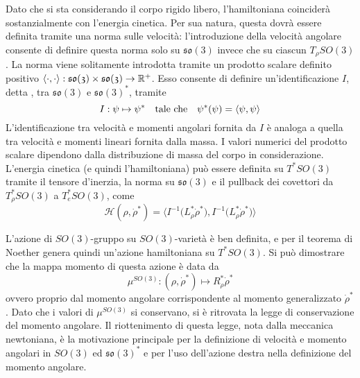 Dato che si sta considerando il corpo rigido libero, l'hamiltoniana coinciderà sostanzialmente con l'energia cinetica. Per sua natura, questa dovrà essere definita tramite una norma sulle velocità: l'introduzione della velocità angolare consente di definire questa norma solo su $\mathfrak{so(3)}$ invece che su ciascun $T_{\rho}SO(3)$. La norma viene solitamente introdotta tramite un prodotto scalare definito positivo $\langle \cdot, \cdot\rangle: \mathfrak{so(3)} \times  \mathfrak{so(3)} \to \mathbb{R}^+$. Esso consente di definire un'identificazione $I$, detta , tra $\mathfrak{so(3)}$ e $\mathfrak{so(3)}^*$, tramite
\begin{equation*}
I: \psi \mapsto \psi^* \qqtext{tale che} \psi^* (\psi) = \langle \psi, \psi \rangle
\end{equation*} 
L'identificazione tra velocità e momenti angolari fornita da $I$ è analoga a quella tra velocità e momenti lineari fornita dalla massa. I valori numerici del prodotto scalare dipendono dalla distribuzione di massa del corpo in considerazione. L'energia cinetica (e quindi l'hamiltoniana) può essere definita su $T^* SO(3)$ tramite il tensore d'inerzia, la norma su $\mathfrak{so(3)}$ e il pullback dei covettori da $T^*_{\rho}SO(3)$ a $T^*_{e}SO(3)$, come
\begin{equation*}
\mathcal{H}(\rho, \dot{\rho}^*) = \Big\langle I^{-1}\big(L^*_\rho \dot{\rho}^*\big), I^{-1}\big(L^*_\rho \dot{\rho}^*\big) \Big\rangle
\end{equation*}

L'azione di $SO(3)$-gruppo su $SO(3)$-varietà è ben definita, e per il teorema di Noether genera quindi un'azione hamiltoniana su $T^*SO(3)$. Si può dimostrare che la mappa momento di questa azione è data da 
\begin{equation*}
\mu^{SO(3)}: (\rho, \dot{\rho}^*) \longmapsto R_{\rho}^* \dot{\rho}^* 
\end{equation*}
ovvero proprio dal momento angolare corrispondente al momento generalizzato $\dot{\rho}^*$. Dato che i valori di $\mu^{SO(3)}$ si conservano, si è ritrovata la legge di conservazione del momento angolare. Il riottenimento di questa legge, nota dalla meccanica newtoniana, è la motivazione principale per la definizione di velocità e momento angolari in $SO(3)$ ed $\mathfrak{so(3)}^*$ e per l'uso dell'azione destra nella definizione del momento angolare.

